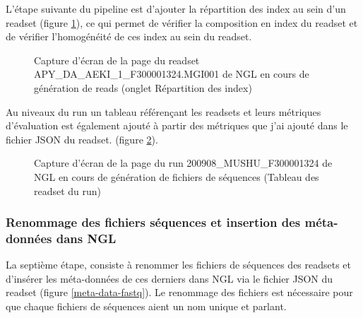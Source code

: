 L'étape suivante du pipeline est d'ajouter la répartition des index au sein d'un readset (figure \ref{NGL-screenshot_readset-index}), ce qui permet de vérifier la composition en index du readset et de vérifier l'homogénéité de ces index au sein du readset.

\begin{figure}[H]
    \centering
    \caption{\footnotesize{Capture d'écran de la page du readset APY\_DA\_AEKI\_1\_F300001324.MGI001 de NGL en cours de génération de reads (onglet \og Répartition des index\fg{})}}
    \label{NGL-screenshot_readset-index}
\end{figure}

Au niveaux du run un tableau référençant les readsets et leurs métriques d'évaluation est également ajouté à partir des métriques que j'ai ajouté dans le fichier JSON du readset. (figure \ref{NGL-screenshot_tab-run-readset}).

\begin{figure}[H]
    \centering
    \caption{\footnotesize{Capture d'écran de la page du run 200908\_MUSHU\_F300001324 de NGL en cours de génération de fichiers de séquences (Tableau des readset du run)}}
    \label{NGL-screenshot_tab-run-readset}
\end{figure}

\subsubsection*{Renommage des fichiers séquences et insertion des méta-données dans NGL}
La septième étape, consiste à renommer les fichiers de séquences des readsets et d'insérer les méta-données de ces derniers dans NGL via le fichier JSON du readset (figure \ref{meta-data-fastq}).
Le renommage des fichiers est nécessaire pour que chaque fichiers de séquences aient un nom unique et \og parlant\fg{}.\\

